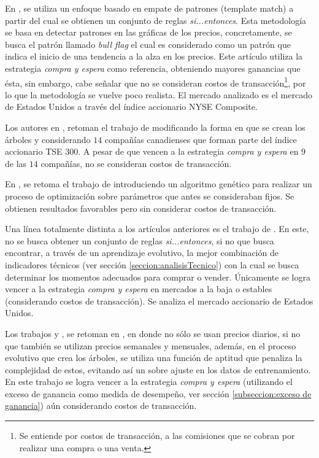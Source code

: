 \documentclass[12pt]{report}
\theoremstyle{break}
\theoremstyle{break}
\begin{document}
En \cite{Leigh2002}, se utiliza un enfoque basado en empate de patrones (template match) a partir del cual se obtienen un conjunto de reglas \textit{si...entonces}. Esta metodología se basa en detectar patrones en las gráficas de los precios, concretamente, se busca el patrón llamado \textit{bull flag} el cual es considerado como un patrón que indica el inicio de una tendencia a la alza en los precios. Este artículo utiliza la estrategia \textit{compra y espera} como referencia, obteniendo mayores ganancias que ésta, sin embargo, cabe señalar que no se consideran costos de transacción\footnote{Se entiende por costos de transacción, a las comisiones que se cobran por realizar una compra o una venta.}, por lo que la metodología se vuelve poco realista. El mercado analizado es el mercado de Estados Unidos a través del índice accionario NYSE Composite.

Los autores en \cite{Potvin2004}, retoman el trabajo de \cite{Allen1999} modificando la forma en que se crean los árboles y considerando $14$ compañías canadienses que forman parte del índice accionario TSE $300$. A pesar de que vencen a la estrategia \textit{compra y espera} en $9$ de las $14$ compañías, no se consideran costos de transacción.

En \cite{Parracho2010}, se retoma el trabajo de \cite{Leigh2002} introduciendo un algoritmo genético para realizar un proceso de optimización sobre parámetros que antes se consideraban fijos. Se obtienen resultados favorables pero sin considerar costos de transacción.

Una línea totalmente distinta a los artículos anteriores es el trabajo de \cite{Kaucic2010}. En este, no se busca obtener un conjunto de reglas \textit{si...entonces}, si no que busca encontrar, a través de un aprendizaje evolutivo, la mejor combinación de indicadores técnicos (ver sección \ref{seccion:analisisTecnico}) con la cual se busca determinar los momentos adecuados para comprar o vender. Únicamente se logra vencer a la estrategia \textit{compra y espera} en mercados a la baja o estables (considerando costos de transacción). Se analiza el mercado accionario de Estados Unidos.

Los trabajos \cite{Allen1999} y \cite{Potvin2004}, se retoman en \cite{Lohpetch2010}, en donde no sólo se usan precios diarios, si no que también se utilizan precios semanales y mensuales, además, en el proceso evolutivo que crea los árboles, se utiliza una función de aptitud que penaliza la complejidad de estos, evitando así un sobre ajuste en los datos de entrenamiento. En este trabajo se logra vencer a la estrategia \textit{compra y espera} (utilizando el exceso de ganancia como medida de desempeño, ver sección \ref{subseccion:exceso de ganancia}) aún considerando costos de transacción.
\end{document}
